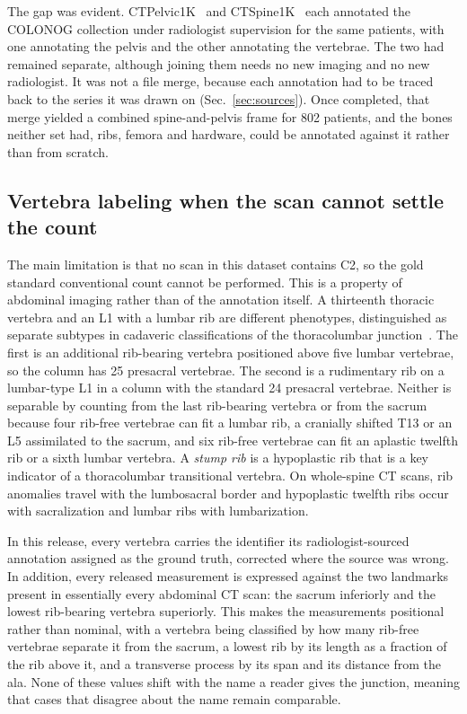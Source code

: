 \documentclass[aapm,mph,amsmath,amssymb,reprint]{revtex4-2}
\begin{document}
The gap was evident. CTPelvic1K~\cite{ctpelvic1k} and CTSpine1K~\cite{ctspine1k} each annotated the COLONOG
collection under radiologist supervision for the same patients, with one annotating the pelvis and the other annotating the vertebrae. The two had remained separate, although joining them needs no new imaging and no new radiologist. It was not a file merge, because each annotation had to be traced back to the series it was
drawn on (Sec.~\ref{sec:sources}). Once completed, that merge yielded a combined spine-and-pelvis frame
for 802 patients, and the bones neither set had, ribs, femora and hardware, could be
annotated against it rather than from scratch.



\subsection{Vertebra labeling when the scan cannot settle the count}

The main limitation is that no scan in this dataset contains C2, so the gold standard
conventional count cannot be performed. This is a property of abdominal imaging rather than of the
annotation itself. A thirteenth thoracic vertebra and an L1 with a lumbar rib are different phenotypes,
distinguished as separate subtypes in cadaveric classifications of the thoracolumbar
junction~\cite{duplessis2018,poolman2023}. The first is an additional rib-bearing vertebra positioned above five lumbar vertebrae, so the column has 25 presacral vertebrae. The second
is a rudimentary rib on a lumbar-type L1 in a column with the standard 24 presacral vertebrae. Neither is separable by counting from the last rib-bearing vertebra or from the sacrum because four rib-free vertebrae can fit a lumbar rib, a cranially
shifted T13 or an L5 assimilated to the sacrum, and six rib-free vertebrae can fit an aplastic twelfth rib or a
sixth lumbar vertebra. A \emph{stump rib} is a hypoplastic rib that is a key indicator of a
thoracolumbar transitional vertebra. On whole-spine CT scans, rib anomalies travel with the lumbosacral border and hypoplastic
twelfth ribs occur with sacralization and lumbar ribs with lumbarization.~\cite{nagata2025}

In this release, every vertebra carries the identifier its
radiologist-sourced annotation assigned as the ground truth, corrected where the source was wrong. In addition, every released measurement is expressed against the two landmarks
present in essentially every abdominal CT scan: the sacrum inferiorly and the lowest rib-bearing
vertebra superiorly. This makes the measurements positional rather than nominal, with a vertebra being classified by how many rib-free
vertebrae separate it from the sacrum, a lowest rib by its length as a fraction of the rib
above it, and a transverse process by its span and its distance from the ala. None of these
values shift with the name a reader gives the junction, meaning that cases that disagree about the name
remain comparable.
\end{document}
